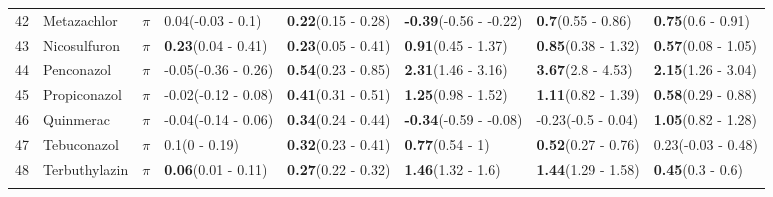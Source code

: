 \begin{longtable}{lp{2cm}p{0.7cm}p{2cm}p{2cm}p{2cm}p{2cm}p{2cm}}
  42 & Metazachlor & $\pi$ & 0.04\newline (-0.03 - 0.1) & \textbf{0.22}\newline (0.15 - 0.28) & \textbf{-0.39}\newline (-0.56 - -0.22) & \textbf{0.7}\newline (0.55 - 0.86) & \textbf{0.75}\newline (0.6 - 0.91) \\ 
  43 & Nicosulfuron & $\pi$ & \textbf{0.23}\newline (0.04 - 0.41) & \textbf{0.23}\newline (0.05 - 0.41) & \textbf{0.91}\newline (0.45 - 1.37) & \textbf{0.85}\newline (0.38 - 1.32) & \textbf{0.57}\newline (0.08 - 1.05) \\ 
  44 & Penconazol & $\pi$ & -0.05\newline (-0.36 - 0.26) & \textbf{0.54}\newline (0.23 - 0.85) & \textbf{2.31}\newline (1.46 - 3.16) & \textbf{3.67}\newline (2.8 - 4.53) & \textbf{2.15}\newline (1.26 - 3.04) \\ 
  45 & Propiconazol & $\pi$ & -0.02\newline (-0.12 - 0.08) & \textbf{0.41}\newline (0.31 - 0.51) & \textbf{1.25}\newline (0.98 - 1.52) & \textbf{1.11}\newline (0.82 - 1.39) & \textbf{0.58}\newline (0.29 - 0.88) \\ 
  46 & Quinmerac & $\pi$ & -0.04\newline (-0.14 - 0.06) & \textbf{0.34}\newline (0.24 - 0.44) & \textbf{-0.34}\newline (-0.59 - -0.08) & -0.23\newline (-0.5 - 0.04) & \textbf{1.05}\newline (0.82 - 1.28) \\ 
  47 & Tebuconazol & $\pi$ & 0.1\newline (0 - 0.19) & \textbf{0.32}\newline (0.23 - 0.41) & \textbf{0.77}\newline (0.54 - 1) & \textbf{0.52}\newline (0.27 - 0.76) & 0.23\newline (-0.03 - 0.48) \\ 
  48 & Terbuthylazin & $\pi$ & \textbf{0.06}\newline (0.01 - 0.11) & \textbf{0.27}\newline (0.22 - 0.32) & \textbf{1.46}\newline (1.32 - 1.6) & \textbf{1.44}\newline (1.29 - 1.58) & \textbf{0.45}\newline (0.3 - 0.6) \\ 
   \bottomrule
\label{tab:var_model_coef}
\end{longtable}
\endgroup
